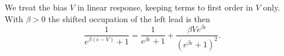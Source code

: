 \documentclass{article}
\begin{document}
We treat the bias $V$ in linear response, keeping terms to first order in $V$ only. With $\beta>0$
the shifted occupation of the left lead is then
\begin{equation}
\frac{1}{e^{\beta(\epsilon-V)}+1} = \frac{1}{e^{\beta\epsilon}+1} + \frac{\beta V e^{\beta\epsilon}}{\left(e^{\beta\epsilon}+1\right)^2} .
\label{eq:lin}
\end{equation}
\end{document}
